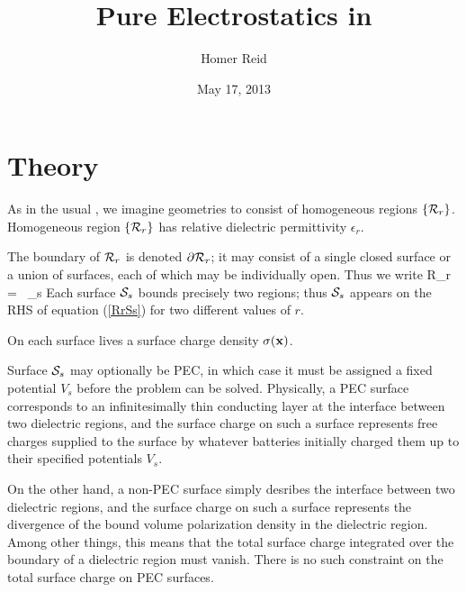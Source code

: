 \documentclass[letterpaper]{article}
\title {Pure Electrostatics in \ls}
\author {Homer Reid}
\date {May 17, 2013}
\begin{document}
\pagestyle{myheadings}
\maketitle

\tableofcontents

\section{Theory}

As in the usual \ls, we imagine geometries to consist
of homogeneous regions $\{\mathcal{R}_r\}$. Homogeneous region 
$\{\mathcal{R}_r\}$ has relative dielectric permittivity 
$\epsilon_r.$ 

The boundary of $\mathcal{R}_r$ is denoted $\partial \mathcal{R}_r$; 
it may consist of a single closed surface or a union of
surfaces, each of which may be individually open.
Thus we write 
 { \partial \mc R_r = \cup \, _s }
Each surface $\mathcal{S}_s$ bounds precisely two regions; 
thus $\mathcal{S}_s$ appears on the RHS of equation (\ref{RrSs})
for two different values of $r$. 

On each surface lives a surface charge density 
$\sigma(\mathbf{x})$.

Surface $\mathcal{S}_s$ may optionally be PEC, in which case it
must be assigned a fixed potential $V_s$ before the problem
can be solved. Physically, a PEC surface corresponds to
an infinitesimally thin conducting layer at the interface
between two dielectric regions, and the surface charge
on such a surface represents free charges supplied to the
surface by whatever batteries initially charged them up to
their specified  potentials $V_s.$

On the other hand, a non-PEC surface simply desribes the 
interface between two dielectric regions, and the 
surface charge on such a surface represents the divergence
of the bound volume polarization density in the dielectric  
region. Among other things, this means that the total
surface charge integrated over the boundary of a dielectric
region must vanish. There is no such constraint on 
the total surface charge on PEC surfaces.
\end{document}
